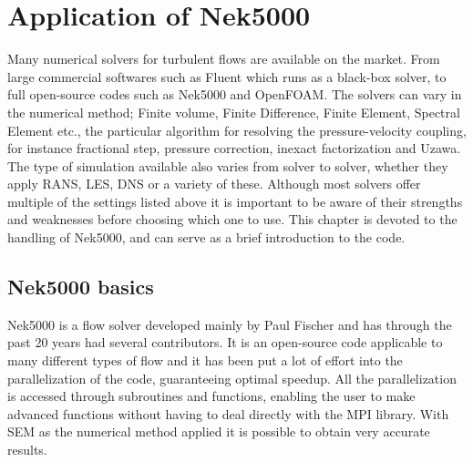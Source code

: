 
\chapter{Application of Nek5000} %

\label{nek} %




Many numerical solvers for turbulent flows are available on the market.
From large commercial softwares such as Fluent which runs as a 
black-box solver, to full open-source codes such as Nek5000 and OpenFOAM. 
The solvers can vary in the numerical method; Finite volume, Finite Difference, 
Finite Element, Spectral Element etc., the particular algorithm 
for resolving the pressure-velocity coupling, for instance fractional step, pressure correction, 
inexact factorization and Uzawa.
The type of simulation available also varies from solver to solver, whether
they apply RANS, LES, DNS or a variety of these. Although most solvers offer multiple of the settings
listed above it is important to be aware of their strengths and weaknesses before choosing which 
one to use. This chapter is devoted to the handling of Nek5000, and can serve
as a brief introduction to the code.

\section{Nek5000 basics}

Nek5000 is a flow solver developed mainly by Paul Fischer
and has through the past 20 years had several contributors. 
It is an open-source code applicable to many different types of flow 
and it has been put a lot of effort into the parallelization of the code, 
guaranteeing optimal speedup. All the parallelization is accessed through subroutines
and functions, enabling the user to make advanced functions without having to 
deal directly with the MPI library.
With SEM as the numerical method applied it is possible to obtain very accurate results.  

